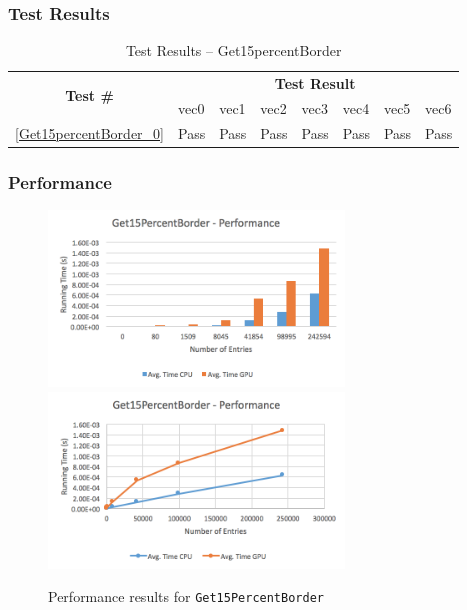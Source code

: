 \documentclass[12pt]{article}
\begin{document}
	\subsubsection{Test Results}
		\begin{table}[H]
		\centering
		\caption{Test Results -- Get15percentBorder}\label{Get15percentBorder_acc}
		\begin{tabular}{clllllll}
		\toprule
		\multirow{2}{*}{\bf Test \#} & \multicolumn{7}{c}{\bf Test Result}\\
		& vec0 & vec1 & vec2 & vec3 & vec4 & vec5 & vec6\\\midrule
		\ref{Get15percentBorder_0} & Pass & Pass & Pass & Pass & Pass & Pass & Pass\\
		\bottomrule
		\end{tabular}
		\end{table}

	\subsubsection{Performance}
		\begin{figure}[H]
    	\centering
    	\caption{Performance results for \texttt{Get15PercentBorder}}\label{figPerformanceGet15Percent}
    	\includegraphics[width=0.7\textwidth]{get15_bar.png}
    	\includegraphics[width=0.7\textwidth]{get15_line.png}
    	\end{figure}
		
\end{document}
